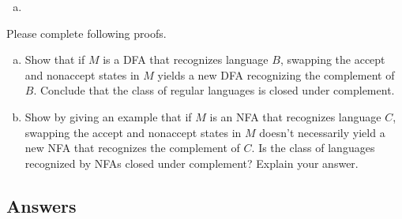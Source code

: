 \documentclass[10pt, legalpaper]{exam}
\begin{document}
\begin{questions}
\begin{enumerate}[(a)]
\begin{tikzpicture}[->,
            >=latex,
            auto,
            node distance=2.5cm,
            semithick,
            baseline=(top.base)]
    \end{tikzpicture}
    
    \item {}    
\end{enumerate}

\newpage
\addpoints
\question[20] Please complete following proofs.
\begin{enumerate}[(a)]
\item {Show that if $M$ is a DFA that recognizes language $B$, swapping the accept and nonaccept states in $M$ yields a new DFA recognizing the complement of $B$. Conclude that the class of regular languages is closed under complement.}
\item {Show by giving an example that if $M$ is an NFA that recognizes language $C$, swapping the accept and nonaccept states in $M$ doesn't necessarily yield a new NFA that recognizes the complement of $C$. Is the class of languages recognized by NFAs closed under complement? Explain your answer.}
\end{enumerate}

\subsection*{Answers}


\end{questions}
\end{document}
